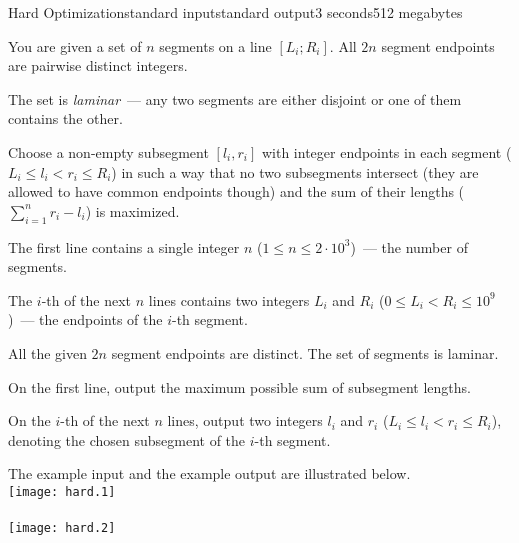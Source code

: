 \begin{problem}{Hard Optimization}{standard input}{standard output}{3 seconds}{512 megabytes}

You are given a set of $n$ segments on a line $[L_i; R_i]$. All $2n$ segment endpoints are pairwise distinct integers.

The set is \emph{laminar}~--- any two segments are either disjoint or one of them contains the other.

Choose a non-empty subsegment $[l_i, r_i]$ with integer endpoints in each segment ($L_i \le l_i < r_i \le R_i$) in such a way that no two subsegments intersect (they are allowed to have common endpoints though) and the sum of their lengths ($\sum_{i=1}^n r_i - l_i$) is maximized.

\InputFile
The first line contains a single integer $n$ ($1 \le n \le 2 \cdot 10^3$)~--- the number of segments.

The $i$-th of the next $n$ lines contains two integers $L_i$ and $R_i$ ($0 \le L_i < R_i \le 10^9$)~--- the endpoints of the $i$-th segment.

All the given $2n$ segment endpoints are distinct. The set of segments is laminar.

\OutputFile
On the first line, output the maximum possible sum of subsegment lengths.

On the $i$-th of the next $n$ lines, output two integers $l_i$ and $r_i$ ($L_i \le l_i < r_i \le R_i$), denoting the chosen subsegment of the $i$-th segment.

\Example

\begin{example}
%
\end{example}

\Note
The example input and the example output are illustrated below.
\\
\texttt{[image: hard.1]}
\\
\\
\texttt{[image: hard.2]}

\end{problem}

